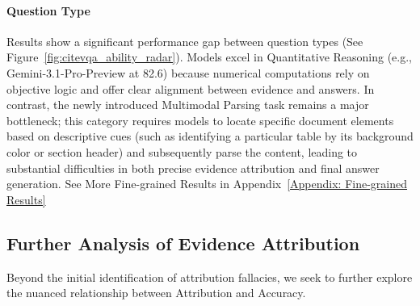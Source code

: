 \documentclass{llmxive}
\begin{document}
{\begin{figure}[t]
\end{figure}

\paragraph{Question Type} Results show a significant performance gap between question types (See Figure~\ref{fig:citevqa_ability_radar}). Models excel in Quantitative Reasoning (e.g., Gemini-3.1-Pro-Preview at 82.6) because numerical computations rely on objective logic and offer clear alignment between evidence and answers. In contrast, the newly introduced Multimodal Parsing task remains a major bottleneck; this category requires models to locate specific document elements based on descriptive cues (such as identifying a particular table by its background color or section header) and subsequently parse the content, leading to substantial difficulties in both precise evidence attribution and final answer generation. See More Fine-grained Results in Appendix~\ref{Appendix: Fine-grained Results}

\subsection{Further Analysis of Evidence Attribution}

Beyond the initial identification of attribution fallacies, we seek to further explore the nuanced relationship between Attribution and Accuracy.


\begin{table}[htbp]
 \centering
 \scriptsize


\end{table}}
\end{document}
